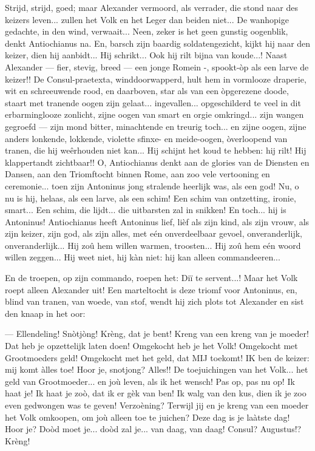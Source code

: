 \documentclass[a4paper, 12pt, oneside, dutch]{article}
\begin{document}
Strijd, strijd, goed; maar Alexander vermoord, als verrader, die stond naar des keizers leven... zullen het Volk en het Leger dan beiden niet... De wanhopige gedachte, in den wind, verwaait... Neen, zeker is het geen gunstig oogenblik, denkt Antiochianus na. En, barsch zijn baardig soldatengezicht, kijkt hij naar den keizer, dien hij aanbidt... Hij schrikt... Ook hij rilt bijna van koude...! Naast Alexander --- fier, stevig, breed --- een jonge Romein -, spookt-òp als een larve de keizer!! De Consul-praetexta, winddoorwapperd, hult hem in vormlooze draperie, wit en schreeuwende rood, en daarboven, star als van een òpgerezene doode, staart met tranende oogen zijn gelaat... ingevallen... opgeschilderd te veel in dit erbarminglooze zonlicht, zijne oogen van smart en orgie omkringd... zijn wangen gegroefd --- zijn mond bitter, minachtende en treurig toch... en zijne oogen, zijne anders lonkende, lokkende, violette sfinxe- en meide-oogen, òverloopend van tranen, die hij weêrhouden niet kan... Hij schijnt het koud te hebben: hij rilt! Hij klappertandt zichtbaar!! O, Antiochianus denkt aan de glories van de Diensten en Dansen, aan den Triomftocht binnen Rome, aan zoo vele vertooning en ceremonie... toen zijn Antoninus jong stralende heerlijk was, als een god! Nu, o nu is hij, helaas, als een larve, als een schim! Een schim van ontzetting, ironie, smart... Een schim, die lijdt... die uitbarsten zal in snikken! En toch... hij is Antoninus! Antiochianus heeft Antoninus lief, lièf als zijn kind, als zijn vrouw, als zijn keizer, zijn god, als zijn alles, met eén onverdeelbaar gevoel, onveranderlijk, onveranderlijk... Hij zoû hem willen warmen, troosten... Hij zoû hem eén woord willen zeggen... Hij weet niet, hij kàn niet: hij kan alleen commandeeren...

En de troepen, op zijn commando, roepen het: Diï te servent...! Maar het Volk roept alleen Alexander uit! Een marteltocht is deze triomf voor Antoninus, en, blind van tranen, van woede, van stof, wendt hij zich plots tot Alexander en sist den knaap in het oor:

--- Ellendeling! Snòtjòng! Krèng, dat je bent! Kreng van een kreng van je moeder! Dat heb je opzettelijk laten doen! Omgekocht heb je het Volk! Omgekocht met Grootmoeders geld! Omgekocht met het geld, dat MIJ toekomt! IK ben de keizer: mij komt àlles toe! Hoor je, snotjong? Alles!! De toejuichingen van het Volk... het geld van Grootmoeder... en joù leven, als ik het wensch! Pas op, pas nu op! Ik haat je! Ik haat je zoò, dat ik er gèk van ben! Ik walg van den kus, dien ik je zoo even gedwongen was te geven! Verzoèning? Terwijl jij en je kreng van een moeder het Volk omkoopen, om joù alleen toe te juichen? Deze dag is je laàtste dag! Hoor je? Doòd moet je... doòd zal je... van daag, van daag! Consul? Augustus!? Krèng!
\end{document}
